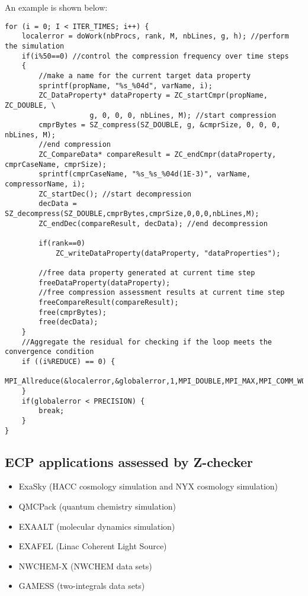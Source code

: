 An example is shown below:
\begin{lstlisting}[style=CStyle, basicstyle = \footnotesize\ttfamily]
for (i = 0; I < ITER_TIMES; i++) {
    localerror = doWork(nbProcs, rank, M, nbLines, g, h); //perform the simulation
    if(i%50==0) //control the compression frequency over time steps
    {
        //make a name for the current target data property
    	sprintf(propName, "%s_%04d", varName, i);
    	ZC_DataProperty* dataProperty = ZC_startCmpr(propName, ZC_DOUBLE, \
                    g, 0, 0, 0, nbLines, M); //start compression
    	cmprBytes = SZ_compress(SZ_DOUBLE, g, &cmprSize, 0, 0, 0, nbLines, M);
        //end compression
    	ZC_CompareData* compareResult = ZC_endCmpr(dataProperty, cmprCaseName, cmprSize);
    	sprintf(cmprCaseName, "%s_%s_%04d(1E-3)", varName, compressorName, i);
    	ZC_startDec(); //start decompression
    	decData = SZ_decompress(SZ_DOUBLE,cmprBytes,cmprSize,0,0,0,nbLines,M);	
    	ZC_endDec(compareResult, decData); //end decompression			

    	if(rank==0)
    		ZC_writeDataProperty(dataProperty, "dataProperties");
    	
        //free data property generated at current time step		
    	freeDataProperty(dataProperty);
        //free compression assessment results at current time step
    	freeCompareResult(compareResult);
    	free(cmprBytes);
    	free(decData);
    }
    //Aggregate the residual for checking if the loop meets the convergence condition
    if ((i%REDUCE) == 0) {
    	MPI_Allreduce(&localerror,&globalerror,1,MPI_DOUBLE,MPI_MAX,MPI_COMM_WORLD);
    }
    if(globalerror < PRECISION) {
    	break;
    }
}

\end{lstlisting}

\subsection{ECP applications assessed by Z-checker}

\begin{itemize}
  \item ExaSky (HACC cosmology simulation and NYX cosmology simulation)
  \item QMCPack (quantum chemistry simulation)
  \item EXAALT (molecular dynamics simulation)
  \item EXAFEL (Linac Coherent Light Source)
  \item NWCHEM-X (NWCHEM data sets)
  \item GAMESS (two-integrals data sets)
\end{itemize}

